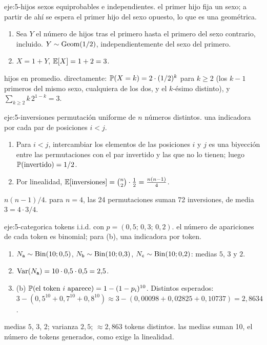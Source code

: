 \begin{solucion}{eje:5-hijos}
\datos sexos equiprobables e independientes.
\planteamiento el primer hijo fija un sexo; a partir de ahí se espera el primer hijo del sexo opuesto, lo que es una geométrica.
\pasos
\begin{enumerate}[label=\arabic*.]
  \item Sea $Y$ el número de hijos tras el primero hasta el primero del sexo contrario, incluido. $Y\sim\operatorname{Geom}(1/2)$, independientemente del sexo del primero.
  \item $X=1+Y$, $\mathbb{E}[X]=1+2=3$.
\end{enumerate}
 hijos en promedio.
\comprobacion directamente: $\mathbb{P}(X=k)=2\cdot(1/2)^{k}$ para $k\ge2$ (los $k-1$ primeros del mismo sexo, cualquiera de los dos, y el $k$-ésimo distinto), y $\sum_{k\ge2}k\,2^{1-k}=3$.
\end{solucion}

\begin{solucion}{eje:5-inversiones}
\datos permutación uniforme de $n$ números distintos.
\planteamiento una indicadora por cada par de posiciones $i<j$.
\pasos
\begin{enumerate}[label=\arabic*.]
  \item Para $i<j$, intercambiar los elementos de las posiciones $i$ y $j$ es una biyección entre las permutaciones con el par invertido y las que no lo tienen; luego $\mathbb{P}(\text{invertido})=1/2$.
  \item Por linealidad, $\mathbb{E}[\text{inversiones}]=\binom n2\cdot\frac12=\frac{n(n-1)}4$.
\end{enumerate}
\resultado $n(n-1)/4$.
\comprobacion para $n=4$, las 24 permutaciones suman 72 inversiones, de media $3=4\cdot3/4$.
\end{solucion}

\begin{solucion}{eje:5-categorica}
 tokens i.i.d. con $p=(0{,}5;\,0{,}3;\,0{,}2)$.
\planteamiento el número de apariciones de cada token es binomial; para (b), una indicadora por token.
\pasos
\begin{enumerate}[label=\arabic*.]
  \item $N_{\texttt a}\sim\operatorname{Bin}(10;0{,}5)$, $N_{\texttt b}\sim\operatorname{Bin}(10;0{,}3)$, $N_{\texttt c}\sim\operatorname{Bin}(10;0{,}2)$: medias $5$, $3$ y $2$.
  \item $\operatorname{Var}(N_{\texttt a})=10\cdot0{,}5\cdot0{,}5=2{,}5$.
  \item (b) $\mathbb{P}(\text{el token }i\text{ aparece})=1-(1-p_i)^{10}$. Distintos esperados: $3-(0{,}5^{10}+0{,}7^{10}+0{,}8^{10})\approx3-(0{,}00098+0{,}02825+0{,}10737)=2{,}8634$.
\end{enumerate}
\resultado medias $5$, $3$, $2$; varianza $2{,}5$; $\approx2{,}863$ tokens distintos.
\comprobacion las medias suman 10, el número de tokens generados, como exige la linealidad.
\end{solucion}

